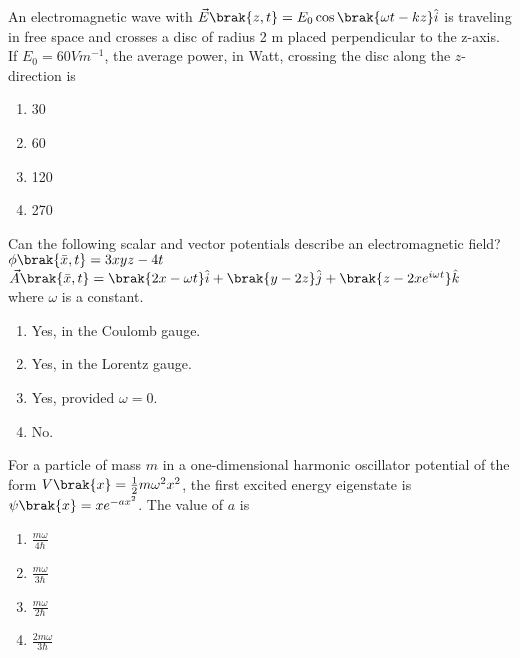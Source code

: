 \iffalse
	\title{2007-PH}
	\author{ee24btech11027 - satwikagv}
	\section{ph}
	\chapter{2007}
\fi
\item An electromagnetic wave with $\vec{E}\brak{z,t}=E_0\cos\brak{\omega t-kz}\hat{i}$ is traveling in free space and crosses a disc of radius 2 m placed perpendicular to the z-axis. If $E_0=60 V m^{-1}$, the average power, in Watt, crossing the disc along the $z$-direction is 
\begin{multicols}{4}
\begin{enumerate}
    \item 30
    \item 60
    \item 120
    \item 270
\end{enumerate}
\end{multicols}
\item Can the following scalar and vector potentials describe an electromagnetic field? 
$\phi\brak{\bar{x},t}=3xyz-4t$ \\
$\vec{A}\brak{\bar{x},t}=\brak{2x-\omega t}\hat{i}+\brak{y-2z}\hat{j}+\brak{z-2xe^{i\omega t}}\hat{k}$
\\ where $\omega$ is a constant.
\begin{multicols}{2}
    \begin{enumerate}
        \item Yes, in the Coulomb gauge.
        \item Yes, in the Lorentz gauge.
        \item Yes, provided $\omega = 0$.
        \item No.
    \end{enumerate}
\end{multicols}
\item For a particle of mass $m$ in a one-dimensional harmonic oscillator potential of the form $V\brak{x}=\frac{1}{2}m{\omega}^2x^2$, the first excited energy eigenstate is $\psi \brak{x}=xe^{-ax^2}$. The value of $a$ is
\begin{multicols}{4}
    \begin{enumerate}
	    \item $\frac{m\omega}{4\hbar}$
	    \item $\frac{m\omega}{3\hbar}$
	    \item $\frac{m\omega}{2\hbar}$
	    \item $\frac{2m\omega}{3\hbar}$
    \end{enumerate}
\end{multicols}
